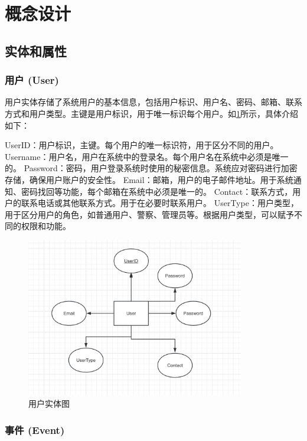 \section{概念设计}

\subsection{实体和属性}

\subsubsection{用户 (User)}

用户实体存储了系统用户的基本信息，包括用户标识、用户名、密码、邮箱、联系方式和用户类型。主键是用户标识，用于唯一标识每个用户。如\cref{fig:entity-user}所示，具体介绍如下：

UserID：用户标识，主键。每个用户的唯一标识符，用于区分不同的用户。
Username：用户名，用户在系统中的登录名。每个用户名在系统中必须是唯一的。
Password：密码，用户登录系统时使用的秘密信息。系统应对密码进行加密存储，确保用户账户的安全性。
Email：邮箱，用户的电子邮件地址。用于系统通知、密码找回等功能，每个邮箱在系统中必须是唯一的。
Contact：联系方式，用户的联系电话或其他联系方式。用于在必要时联系用户。
UserType：用户类型，用于区分用户的角色，如普通用户、警察、管理员等。根据用户类型，可以赋予不同的权限和功能。

\begin{figure}[htbp]
    \centering
    \includegraphics[width=0.85\textwidth]{figures/db-img-01.png}
    \caption{用户实体图}
    \label{fig:entity-user}
\end{figure}

\subsubsection{事件 (Event)}

